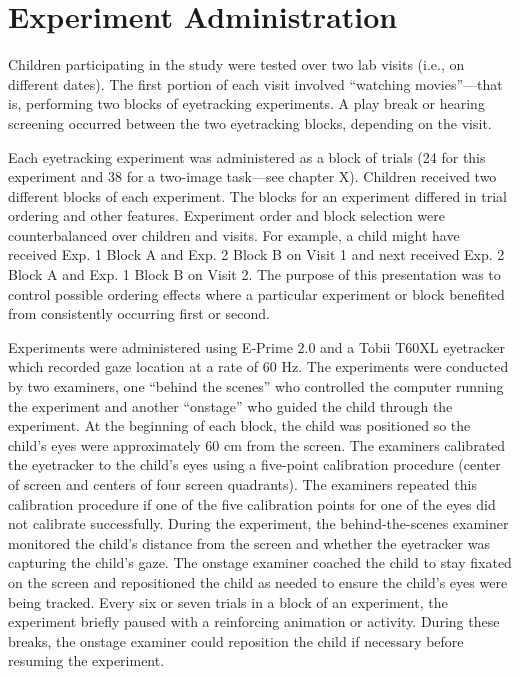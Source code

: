 \documentclass [11pt, proquest] {uwthesis}[2015/03/03]
\begin{document}
\section{Experiment Administration}\label{experiment-administration}

Children participating in the study were tested over two lab visits
(i.e., on different dates). The first portion of each visit involved
``watching movies''---that is, performing two blocks of eyetracking
experiments. A play break or hearing screening occurred between the two
eyetracking blocks, depending on the visit.

Each eyetracking experiment was administered as a block of trials (24
for this experiment and 38 for a two-image task---see chapter X).
Children received two different blocks of each experiment. The blocks
for an experiment differed in trial ordering and other features.
Experiment order and block selection were counterbalanced over children
and visits. For example, a child might have received Exp. 1 Block A and
Exp. 2 Block B on Visit 1 and next received Exp. 2 Block A and Exp. 1
Block B on Visit 2. The purpose of this presentation was to control
possible ordering effects where a particular experiment or block
benefited from consistently occurring first or second.

Experiments were administered using E-Prime 2.0 and a Tobii T60XL
eyetracker which recorded gaze location at a rate of 60 Hz. The
experiments were conducted by two examiners, one ``behind the scenes''
who controlled the computer running the experiment and another
``onstage'' who guided the child through the experiment. At the
beginning of each block, the child was positioned so the child's eyes
were approximately 60 cm from the screen. The examiners calibrated the
eyetracker to the child's eyes using a five-point calibration procedure
(center of screen and centers of four screen quadrants). The examiners
repeated this calibration procedure if one of the five calibration
points for one of the eyes did not calibrate successfully. During the
experiment, the behind-the-scenes examiner monitored the child's
distance from the screen and whether the eyetracker was capturing the
child's gaze. The onstage examiner coached the child to stay fixated on
the screen and repositioned the child as needed to ensure the child's
eyes were being tracked. Every six or seven trials in a block of an
experiment, the experiment briefly paused with a reinforcing animation
or activity. During these breaks, the onstage examiner could reposition
the child if necessary before resuming the experiment.
\end{document}
